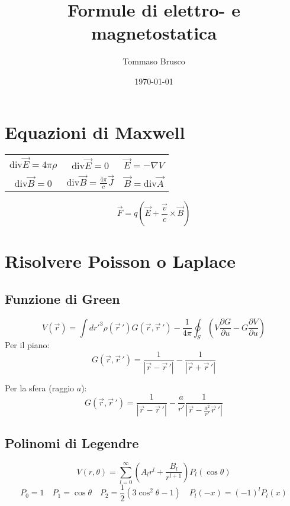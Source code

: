 \documentclass[a4paper, 11pt]{article}
\author{Tommaso Brusco}
\title{Formule di elettro- e magnetostatica}
\date{\today}
\renewcommand{\div}{\mathrm{div}}
\newcommand{\rot}{\mathrm{div}}
\begin{document}
	\maketitle

	\section{Equazioni di Maxwell}
	\label{maxwell}
	\begin{table}[h!]
		\centering
		\label{tab:maxwell}
		\begin{tabular}{ccc}
			$\div\vec{E}=4\pi\rho$ & $\rot\vec{E}=0$ & $\vec{E} = -\nabla V $\\[5pt]
			$\div\vec{B}=0$ & $\rot\vec{B}=\frac{4\pi}{c}\vec{J}$ & $\vec{B}=\rot\vec{A}$\\
		\end{tabular}
	\end{table}

	$$\vec{F} = q\left(\vec{E}+\frac{\vec{v}}{c}\times\vec{B}\right)$$

	\section{Risolvere Poisson o Laplace}
	\label{poislap}
	\subsection{Funzione di Green}
	$$V\left(\vec{r}  \right) = \int dr'^3 \rho\left( \vec{r}\,' \right) G\left( \vec{r}, \vec{r}\,' \right) - \frac{1}{4\pi}\oint _S \left( V \frac{\partial G}{\partial u} - G \frac{\partial V}{\partial u} \right) $$
	Per il piano:
	$$G\left( \vec{r}, \vec{r}\,' \right) = \frac{1}{|\vec{r} - \vec{r}\,'|} - \frac{1}{|\vec{r} + \vec{r}\,'|}$$

Per la sfera (raggio $a$):
	$$G\left( \vec{r}, \vec{r}\,' \right) = \frac{1}{|\vec{r} - \vec{r}\,'|} - \frac{a}{r'} \frac{1}{|\vec{r} - \frac{a^2}{r'} \vec{r}\,'|}$$

	\subsection{Polinomi di Legendre}
	$$V\left( r, \theta \right) = \sum_{l=0}^{\infty} \left( A_l r^l + \frac{B_l}{r^{l+1}} \right) P_l\left( \cos\theta \right) $$
	$$P_0 = 1 \quad P_1 = \cos\theta \quad P_2 = \frac{1}{2}\left( 3\cos ^2 \theta - 1 \right) \quad P_l\left( -x \right) = \left( -1 \right) ^l P_l \left( x \right) $$
\end{document}
